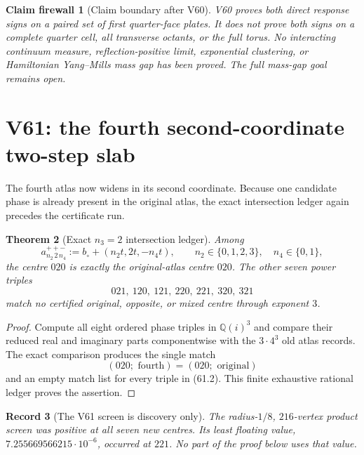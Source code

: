 \documentclass[11pt,oneside]{article}
\newtheorem{theorem}{Theorem}[section]
\newtheorem{firewall}[theorem]{Claim firewall}
\newtheorem{record}[theorem]{Record}
\theoremstyle{definition}
\theoremstyle{remark}
\begin{document}
\begin{firewall}[Claim boundary after V60]
\label{fire:newv60-final}
V60 proves both direct response signs on a paired set of first
quarter-face plates.  It does not prove both signs on a complete
quarter cell, all transverse octants, or the full torus.  No
interacting continuum measure, reflection-positive limit,
exponential clustering, or Hamiltonian Yang--Mills mass gap has
been proved.  The full mass-gap goal remains open.
\end{firewall}

\section{V61: the fourth second-coordinate two-step slab}
\label{sec:newv61-fourth-second-two-step}

The fourth atlas now widens in its second coordinate.  Because one
candidate phase is already present in the original atlas, the exact
intersection ledger again precedes the certificate run.

\begin{theorem}[Exact \(n_3=2\) intersection ledger]
\label{thm:newv61-intersections}
Among
\[
 a_{n_2\,2\,n_4}^{++-}
 :=b_\circ+(n_2t,2t,-n_4t),
 \qquad n_2\in\{0,1,2,3\},\quad n_4\in\{0,1\},        \tag{61.1}
\]
the centre \(020\) is exactly the original-atlas centre \(020\).
The other seven power triples
\[
 021,\ 120,\ 121,\ 220,\ 221,\ 320,\ 321             \tag{61.2}
\]
match no certified original, opposite, or mixed centre through
exponent \(3\).
\end{theorem}

\begin{proof}
Compute all eight ordered phase triples in \(\mathbb Q(i)^3\) and
compare their reduced real and imaginary parts componentwise with
the \(3\cdot4^3\) old atlas records.  The exact comparison produces
the single match
\[
 (020;\text{ fourth})=(020;\text{ original})
\]
and an empty match list for every triple in (61.2).  This finite
exhaustive rational ledger proves the assertion.
\end{proof}

\begin{record}[The V61 screen is discovery only]
\label{rec:newv61-screen}
The radius-\(1/8\), \(216\)-vertex product screen was positive at
all seven new centres.  Its least floating value,
\(7.255669566215\cdot10^{-6}\), occurred at \(221\).  No part of
the proof below uses that value.
\end{record}
\end{document}
